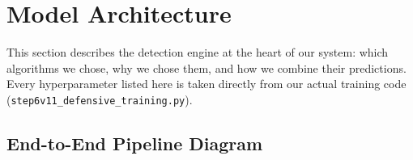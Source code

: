 \documentclass[11pt, a4paper]{article}
\begin{document}
\section{Model Architecture}

This section describes the detection engine at the heart of our system: which algorithms
we chose, why we chose them, and how we combine their predictions. Every hyperparameter
listed here is taken directly from our actual training code
(\texttt{step6v11\_defensive\_training.py}).

\subsection{End-to-End Pipeline Diagram}
\end{document}
